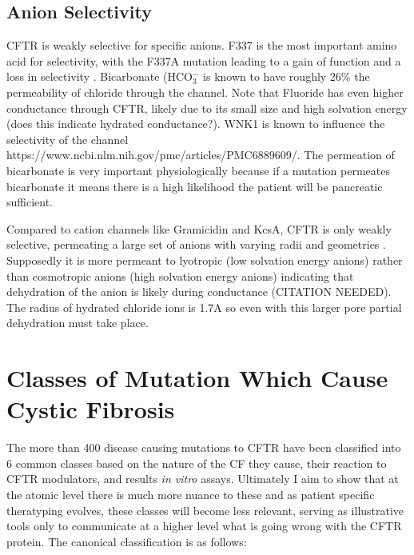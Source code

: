 \subsection {Anion Selectivity}
CFTR is weakly selective for specific anions. F337 is the most important amino acid for selectivity, with the F337A mutation leading to a gain of function and a loss in selectivity \cite{wei2016}. Bicarbonate (HCO$_3^-$ is known to have roughly 26\% the permeability of chloride through the channel. Note that Fluoride has even higher conductance through CFTR, likely due to its small size and high solvation energy (does this indicate hydrated conductance?). WNK1 is known to influence the selectivity of the channel https://www.ncbi.nlm.nih.gov/pmc/articles/PMC6889609/. The permeation of bicarbonate is very important physiologically because if a mutation permeates bicarbonate it means there is a high likelihood the patient will be pancreatic sufficient. 

Compared to cation channels like Gramicidin and KcsA, CFTR is only weakly selective, permeating a large set of anions with varying radii and geometries \cite{}. Supposedly it is more permeant to lyotropic (low solvation energy anions) rather than cosmotropic anions (high solvation energy anions) indicating that dehydration of the anion is likely during conductance (CITATION NEEDED). The radius of hydrated chloride ions is 1.7A \cite{yang2002} so even with this larger pore partial dehydration must take place. 


\section{Classes of Mutation Which Cause Cystic Fibrosis}
The more than 400 disease causing mutations to CFTR have been classified into 6 common classes based on the nature of the CF they cause, their reaction to CFTR modulators, and results \textit{in vitro} assays. Ultimately I aim to show that at the atomic level there is much more nuance to these and as patient specific theratyping evolves, these classes will become less relevant, serving as illustrative tools only to communicate at a higher level what is going wrong with the CFTR protein. The canonical classification is as follows:

